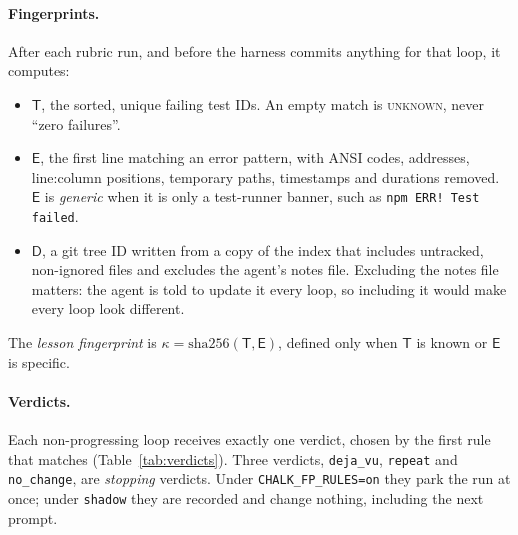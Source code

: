 \documentclass[11pt]{article}
\theoremstyle{remark}
\newcommand{\Tset}{\mathsf{T}}
\newcommand{\Eerr}{\mathsf{E}}
\newcommand{\Dtree}{\mathsf{D}}
\begin{document}
\paragraph{Fingerprints.}
After each rubric run, and before the harness commits anything for that loop, it computes:
\begin{itemize}[leftmargin=*]
\item $\Tset$, the sorted, unique failing test IDs. An empty match is \textup{\textsc{unknown}}, never ``zero failures''.
\item $\Eerr$, the first line matching an error pattern, with ANSI codes, addresses, line:column positions, temporary paths, timestamps and durations removed. $\Eerr$ is \emph{generic} when it is only a test-runner banner, such as \texttt{npm ERR! Test failed}.
\item $\Dtree$, a git tree ID written from a copy of the index that includes untracked, non-ignored files and excludes the agent's notes file. Excluding the notes file matters: the agent is told to update it every loop, so including it would make every loop look different.
\end{itemize}
The \emph{lesson fingerprint} is $\kappa=\mathrm{sha256}(\Tset,\Eerr)$, defined only when $\Tset$ is known or $\Eerr$ is specific.

\paragraph{Verdicts.}
Each non-progressing loop receives exactly one verdict, chosen by the first rule that matches (Table~\ref{tab:verdicts}). Three verdicts, \texttt{deja\_vu}, \texttt{repeat} and \texttt{no\_change}, are \emph{stopping} verdicts. Under \texttt{CHALK\_FP\_RULES=on} they park the run at once; under \texttt{shadow} they are recorded and change nothing, including the next prompt.
\end{document}
